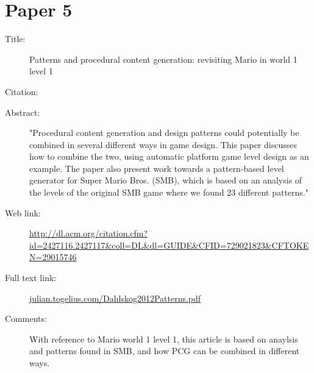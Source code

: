 \documentclass{scrartcl}
\begin{document}
\section*{Paper 5}
\begin{description}
\item[Title:] {Patterns and procedural content generation: revisiting Mario in world 1 level 1}
\item[Citation:] \cite{Dahlskog:2012}
\item[Abstract:] "Procedural content generation and design patterns could potentially be combined in several different ways in game design. This paper discusses how to combine the two, using automatic platform game level design as an example. The paper also present work towards a pattern-based level generator for Super Mario Bros. (SMB), which is based on an analysis of the levels of the original SMB game where we found 23 different patterns."
\item[Web link:] \url{http://dl.acm.org/citation.cfm?id=2427116.2427117&coll=DL&dl=GUIDE&CFID=729021823&CFTOKEN=29015746}
\item[Full text link:] \url{julian.togelius.com/Dahlskog2012Patterns.pdf}
\item[Comments:] With reference to Mario world 1 level 1, this article is based on anaylsis and patterns found in SMB, and how PCG can be combined in different ways.
\end{description}



\end{document}
